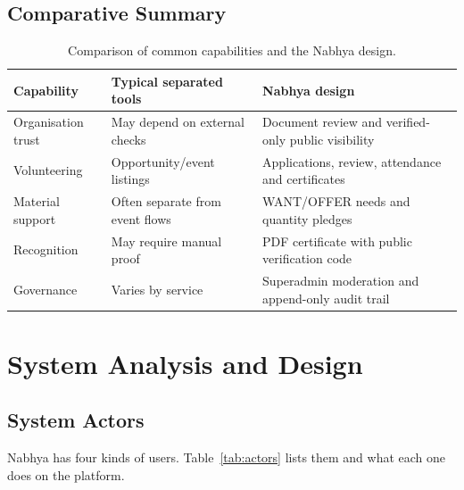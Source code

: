 \section{Comparative Summary}
\begin{table}[H]\centering
\caption{Comparison of common capabilities and the Nabhya design.}
\label{tab:comparison}
\begin{tabularx}{\textwidth}{|p{}|p{}|X|}
\hline
\textbf{Capability} & \textbf{Typical separated tools} & \textbf{Nabhya design}\\ \hline
Organisation trust & May depend on external checks & Document review and verified-only public visibility\\ \hline
Volunteering & Opportunity/event listings & Applications, review, attendance and certificates\\ \hline
Material support & Often separate from event flows & WANT/OFFER needs and quantity pledges\\ \hline
Recognition & May require manual proof & PDF certificate with public verification code\\ \hline
Governance & Varies by service & Superadmin moderation and append-only audit trail\\ \hline
\end{tabularx}
\end{table}

\chapter{System Analysis and Design}
\label{ch:design}

\section{System Actors}
Nabhya has four kinds of users. Table~\ref{tab:actors} lists them and what each one does on the platform.


